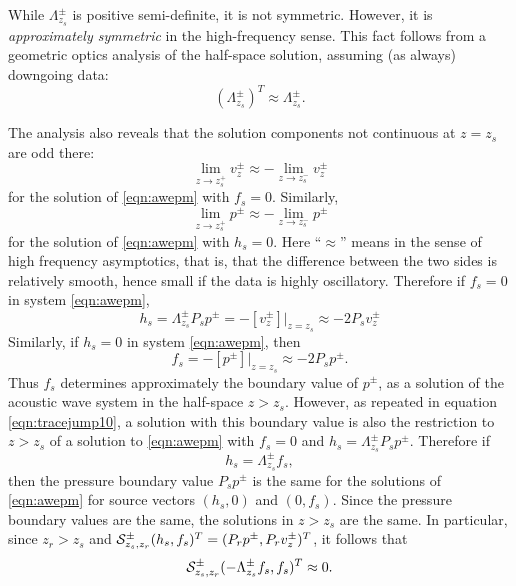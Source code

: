 While $\Lambda^{\pm}_{z_s}$ is positive semi-definite, it is not
symmetric. However, it is {\em approximately symmetric} in the
high-frequency sense. This fact follows from a
geometric optics analysis of the half-space solution,
assuming (as always) downgoing data:
\begin{equation}
  \label{eqn:lamappsim}
  (\Lambda^{\pm}_{z_s})^T \approx \Lambda^{\pm}_{z_s}.
\end{equation}

The analysis also reveals that the solution components not continuous
at $z=z_s$ are odd there:
\begin{equation}
  \label{eqn:odd1}
  \lim_{z\rightarrow z_s^+} v^{\pm}_{z} \approx - \lim_{z\rightarrow z_s^-}
  v^{\pm}_{z}
\end{equation}
for the solution of \ref{eqn:awepm} with $f_s=0$.
Similarly, 
\begin{equation}
  \label{eqn:odd2}
  \lim_{z\rightarrow z_s^+} p^{\pm}\approx - \lim_{z\rightarrow z_s^-}
  p^{\pm}
\end{equation}
for the solution of \ref{eqn:awepm} with $h_s=0$. Here ``$\approx$''
means in the sense of high frequency asymptotics, that is, that the
difference between the two sides is relatively smooth, hence small if
the data is highly oscillatory. Therefore if $f_s=0$ in system \ref{eqn:awepm},
\begin{equation}
  h_s = \Lambda^{\pm}_{z_s}P_sp^{\pm} = -[v^{\pm}_{z}]|_{z=z_s} \approx -2
  P_sv^{\pm}_{z}
  \label{eqn:tracejump10}
\end{equation}
Similarly, if $h_s=0$ in system \ref{eqn:awepm}, then
\begin{equation}
  \label{eqn:tracejump20}
  f_s = -[p^{\pm}]|_{z=z_s} \approx -2 P_s p^{\pm}.
\end{equation}
Thus $f_s$ determines approximately the boundary value of $p^{\pm}$,
as a solution of the acoustic wave system in the half-space
$z>z_s$. However, as repeated in equation \ref{eqn:tracejump10}, a
solution with this boundary value is also the restriction to $z>z_s$
of a solution to \ref{eqn:awepm} with $f_s=0$ and $h_s=
\Lambda^{\pm}_{z_s}P_sp^{\pm}$. Therefore if
\begin{equation}
  \label{eqn:hfcondn}
  h_s =\Lambda^{\pm}_{z_s}f_s,
\end{equation}
then the pressure boundary value $P_sp^{\pm}$ is the
same for the solutions of \ref{eqn:awepm} for source vectors $(h_s,0)$
and $(0,f_s)$. Since the pressure boundary values are the same, the solutions
in $z>z_s$ are the same. In particular, since $z_r>z_s$ and ${\cal
  S}^{\pm}_{z_s,z_r}(h_s,f_s)^T = (P_rp^{\pm},P_rv^{\pm}_z)^T$, it follows
that
\begin{equation}
  \label{eqn:snull}
  {\cal S}^{\pm}_{z_s,z_r}(-\Lambda^{\pm}_{z_s}f_s,f_s)^T \approx 0.
\end{equation}

